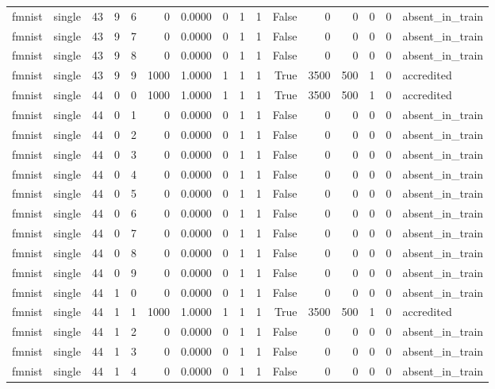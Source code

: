 \begin{tabular}{llrrrrrrrrrrrrrl}
fmnist & single & 43 & 9 & 6 & 0 & 0.0000 & 0 & 1 & 1 & False & 0 & 0 & 0 & 0 & absent\_in\_train \\
fmnist & single & 43 & 9 & 7 & 0 & 0.0000 & 0 & 1 & 1 & False & 0 & 0 & 0 & 0 & absent\_in\_train \\
fmnist & single & 43 & 9 & 8 & 0 & 0.0000 & 0 & 1 & 1 & False & 0 & 0 & 0 & 0 & absent\_in\_train \\
fmnist & single & 43 & 9 & 9 & 1000 & 1.0000 & 1 & 1 & 1 & True & 3500 & 500 & 1 & 0 & accredited \\
fmnist & single & 44 & 0 & 0 & 1000 & 1.0000 & 1 & 1 & 1 & True & 3500 & 500 & 1 & 0 & accredited \\
fmnist & single & 44 & 0 & 1 & 0 & 0.0000 & 0 & 1 & 1 & False & 0 & 0 & 0 & 0 & absent\_in\_train \\
fmnist & single & 44 & 0 & 2 & 0 & 0.0000 & 0 & 1 & 1 & False & 0 & 0 & 0 & 0 & absent\_in\_train \\
fmnist & single & 44 & 0 & 3 & 0 & 0.0000 & 0 & 1 & 1 & False & 0 & 0 & 0 & 0 & absent\_in\_train \\
fmnist & single & 44 & 0 & 4 & 0 & 0.0000 & 0 & 1 & 1 & False & 0 & 0 & 0 & 0 & absent\_in\_train \\
fmnist & single & 44 & 0 & 5 & 0 & 0.0000 & 0 & 1 & 1 & False & 0 & 0 & 0 & 0 & absent\_in\_train \\
fmnist & single & 44 & 0 & 6 & 0 & 0.0000 & 0 & 1 & 1 & False & 0 & 0 & 0 & 0 & absent\_in\_train \\
fmnist & single & 44 & 0 & 7 & 0 & 0.0000 & 0 & 1 & 1 & False & 0 & 0 & 0 & 0 & absent\_in\_train \\
fmnist & single & 44 & 0 & 8 & 0 & 0.0000 & 0 & 1 & 1 & False & 0 & 0 & 0 & 0 & absent\_in\_train \\
fmnist & single & 44 & 0 & 9 & 0 & 0.0000 & 0 & 1 & 1 & False & 0 & 0 & 0 & 0 & absent\_in\_train \\
fmnist & single & 44 & 1 & 0 & 0 & 0.0000 & 0 & 1 & 1 & False & 0 & 0 & 0 & 0 & absent\_in\_train \\
fmnist & single & 44 & 1 & 1 & 1000 & 1.0000 & 1 & 1 & 1 & True & 3500 & 500 & 1 & 0 & accredited \\
fmnist & single & 44 & 1 & 2 & 0 & 0.0000 & 0 & 1 & 1 & False & 0 & 0 & 0 & 0 & absent\_in\_train \\
fmnist & single & 44 & 1 & 3 & 0 & 0.0000 & 0 & 1 & 1 & False & 0 & 0 & 0 & 0 & absent\_in\_train \\
fmnist & single & 44 & 1 & 4 & 0 & 0.0000 & 0 & 1 & 1 & False & 0 & 0 & 0 & 0 & absent\_in\_train \\

\end{tabular}
